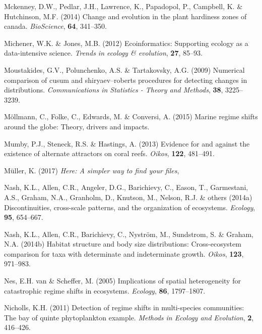 \documentclass[12pt,twoside,openany]{reedthesis}
\begin{document}
\leavevmode\hypertarget{ref-mckenney2014change}{}%
Mckenney, D.W., Pedlar, J.H., Lawrence, K., Papadopol, P., Campbell, K. \& Hutchinson, M.F. (2014) Change and evolution in the plant hardiness zones of canada. \emph{BioScience}, \textbf{64}, 341--350.

\leavevmode\hypertarget{ref-michener2012ecoinformatics}{}%
Michener, W.K. \& Jones, M.B. (2012) Ecoinformatics: Supporting ecology as a data-intensive science. \emph{Trends in ecology \& evolution}, \textbf{27}, 85--93.

\leavevmode\hypertarget{ref-moustakides2009numerical}{}%
Moustakides, G.V., Polunchenko, A.S. \& Tartakovsky, A.G. (2009) Numerical comparison of cusum and shiryaev--roberts procedures for detecting changes in distributions. \emph{Communications in Statistics - Theory and Methods}, \textbf{38}, 3225--3239.

\leavevmode\hypertarget{ref-mollmann2015marine}{}%
Möllmann, C., Folke, C., Edwards, M. \& Conversi, A. (2015) Marine regime shifts around the globe: Theory, drivers and impacts.

\leavevmode\hypertarget{ref-mumby2013evidence}{}%
Mumby, P.J., Steneck, R.S. \& Hastings, A. (2013) Evidence for and against the existence of alternate attractors on coral reefs. \emph{Oikos}, \textbf{122}, 481--491.

\leavevmode\hypertarget{ref-here}{}%
Müller, K. (2017) \emph{Here: A simpler way to find your files},

\leavevmode\hypertarget{ref-nash2014discontinuities}{}%
Nash, K.L., Allen, C.R., Angeler, D.G., Barichievy, C., Eason, T., Garmestani, A.S., Graham, N.A., Granholm, D., Knutson, M., Nelson, R.J. \& others (2014a) Discontinuities, cross-scale patterns, and the organization of ecosystems. \emph{Ecology}, \textbf{95}, 654--667.

\leavevmode\hypertarget{ref-nash2014habitat}{}%
Nash, K.L., Allen, C.R., Barichievy, C., Nyström, M., Sundstrom, S. \& Graham, N.A. (2014b) Habitat structure and body size distributions: Cross-ecosystem comparison for taxa with determinate and indeterminate growth. \emph{Oikos}, \textbf{123}, 971--983.

\leavevmode\hypertarget{ref-van2005implications}{}%
Nes, E.H. van \& Scheffer, M. (2005) Implications of spatial heterogeneity for catastrophic regime shifts in ecosystems. \emph{Ecology}, \textbf{86}, 1797--1807.

\leavevmode\hypertarget{ref-nicholls_detection_2011}{}%
Nicholls, K.H. (2011) Detection of regime shifts in multi-species communities: The bay of quinte phytoplankton example. \emph{Methods in Ecology and Evolution}, \textbf{2}, 416--426.
\end{document}

